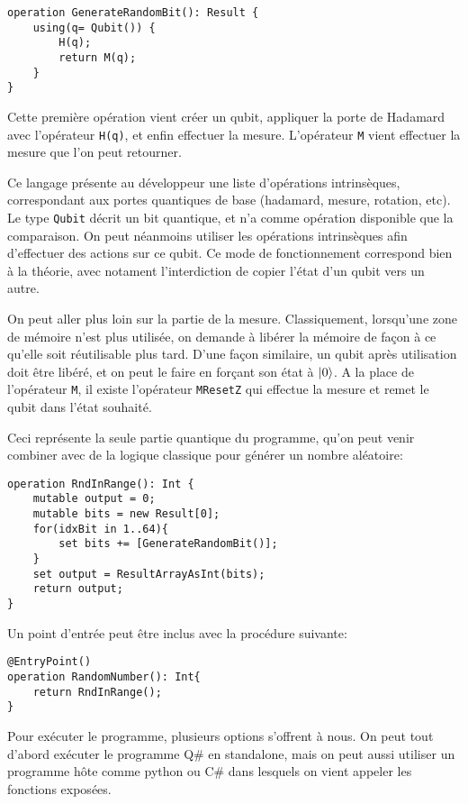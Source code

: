 \documentclass[12pt,a4paper]{article}
\DeclarePairedDelimiter\ket{\lvert}{\rangle}
\begin{document}
\begin{lstlisting}
operation GenerateRandomBit(): Result {
    using(q= Qubit()) {
        H(q);
        return M(q);
    }
}
\end{lstlisting}

Cette première opération vient créer un qubit, appliquer la porte de Hadamard avec l'opérateur \texttt{H(q)}, et enfin effectuer la mesure. L'opérateur \texttt{M} vient effectuer la mesure que l'on peut retourner.

Ce langage présente au développeur une liste d'opérations intrinsèques, correspondant aux portes quantiques de base (hadamard, mesure, rotation, etc). Le type \texttt{Qubit} décrit un bit quantique, et n'a comme opération disponible que la comparaison. On peut néanmoins utiliser les opérations intrinsèques afin d'effectuer des actions sur ce qubit. Ce mode de fonctionnement correspond bien à la théorie, avec notament l'interdiction de copier l'état d'un qubit vers un autre.

On peut aller plus loin sur la partie de la mesure. Classiquement, lorsqu'une zone de mémoire n'est plus utilisée, on demande à libérer la mémoire de façon à ce qu'elle soit réutilisable plus tard. D'une façon similaire, un qubit après utilisation doit être libéré, et on peut le faire en forçant son état à $\ket{0}$. A la place de l'opérateur \texttt{M}, il existe l'opérateur \texttt{MResetZ} qui effectue la mesure et remet le qubit dans l'état souhaité.

\medbreak
Ceci représente la seule partie quantique du programme, qu'on peut venir combiner avec de la logique classique pour générer un nombre aléatoire:

\begin{lstlisting}
operation RndInRange(): Int {
    mutable output = 0;
    mutable bits = new Result[0];
    for(idxBit in 1..64){
        set bits += [GenerateRandomBit()];
    }
    set output = ResultArrayAsInt(bits);
    return output;
}
\end{lstlisting}

Un point d'entrée peut être inclus avec la procédure suivante: 

\begin{lstlisting}
@EntryPoint()
operation RandomNumber(): Int{
    return RndInRange();
}
\end{lstlisting}

Pour exécuter le programme, plusieurs options s'offrent à nous. On peut tout d'abord exécuter le programme Q\# en standalone, mais on peut aussi utiliser un programme hôte comme python ou C\# dans lesquels on vient appeler les fonctions exposées.
\end{document}
